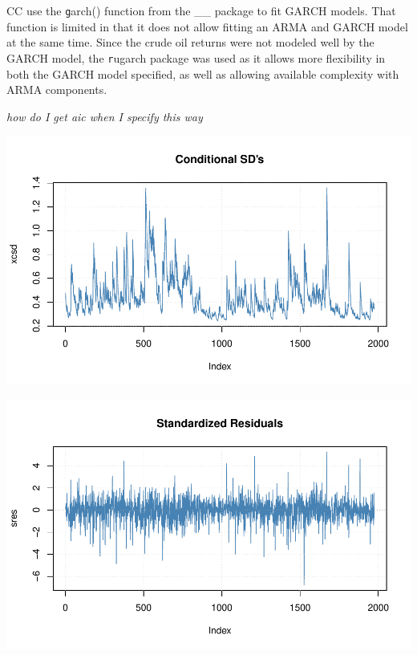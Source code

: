 \documentclass[11pt]{article}\usepackage[]{graphicx}\usepackage[]{color}
\makeatletter
\def\maxwidth{ %
  \ifdim\Gin@nat@width>\linewidth
    \linewidth
  \else
    \Gin@nat@width
  \fi
}
\newenvironment{kframe}{%
 \def\at@end@of@kframe{}%
 \ifinner\ifhmode%
  \def\at@end@of@kframe{\end{minipage}}%
  \begin{minipage}{\columnwidth}%
 \fi\fi%
 \def\FrameCommand##1{\hskip\@totalleftmargin \hskip-\fboxsep
 \colorbox{shadecolor}{##1}\hskip-\fboxsep
     \hskip-\linewidth \hskip-\@totalleftmargin \hskip\columnwidth}%
 \MakeFramed {\advance\hsize-\width
   \@totalleftmargin\z@ \linewidth\hsize
   \@setminipage}}%
 {\par\unskip\endMakeFramed%
 \at@end@of@kframe}
\newenvironment{knitrout}{}{} %
\makeatother
\begin{document}
CC use the {\texttt garch()} function from the __ package to fit GARCH models. That function is limited in that it does not allow fitting an ARMA and GARCH model at the same time. Since the crude oil returns were not modeled well by the GARCH model, the {\texttt rugarch} package was used as it allows more flexibility in both the GARCH model specified, as well as allowing available complexity with ARMA components.

{\it how do I get aic when I specify this way}

\begin{knitrout}\footnotesize
{}\color{fgcolor}\begin{kframe}


{\ttfamily\noindent\bfseries{}}

{\ttfamily\noindent\bfseries{}}\end{kframe}

{\centering \includegraphics[width=\maxwidth]{figure/garch2-1} 

}




{\centering \includegraphics[width=\maxwidth]{figure/garch2-2} 

}
\end{knitrout}
\end{document}
